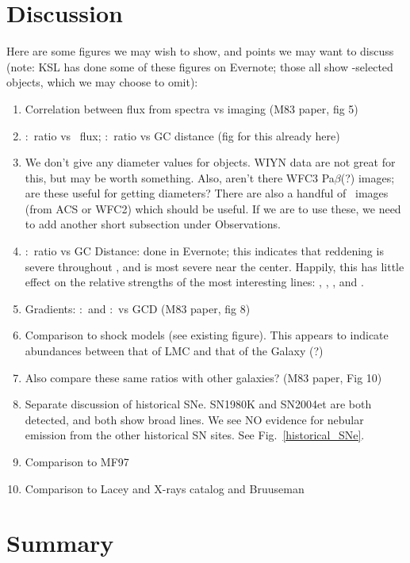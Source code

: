\section{Discussion}
Here are some figures we may wish to show, and points we may want to discuss (note: KSL has done some of these figures on Evernote; those all show \oiii-selected objects, which we may choose to omit):
\begin{enumerate}
    \item Correlation between flux from spectra vs imaging (M83 paper, fig 5)
    \item \sii:\ha\ ratio vs \ha\ flux; \sii:\ha\ ratio vs GC distance (fig for this already here)
    \item We don't give any diameter values for objects.  WIYN data are not great for this, but may be worth something.  Also, aren't there WFC3 Pa$\beta$(?) images; are these useful for getting diameters? There are also a handful of \ha\ images (from ACS or WFC2) which should be useful.  If we are to use these, we need to add another short subsection under Observations.
    \item \hb:\ha\ ratio vs GC Distance: done in Evernote; this indicates that reddening is severe throughout \gal, and is most severe near the center.  Happily, this has little effect on the relative strengths of the most interesting lines: \oi, \ha, \nii, and \sii.
    \item Gradients: \nii:\ha\ and \sii:\ha\ vs GCD (M83 paper, fig 8)
    \item Comparison to shock models (see existing figure).  This appears to indicate abundances between that of LMC and that of the Galaxy (?)
    \item Also compare these same ratios with other galaxies? (M83 paper, Fig 10)
    \item Separate discussion of historical SNe.  SN1980K and SN2004et are both detected, and both show broad lines.  We see NO evidence for nebular  emission from the other historical SN sites.  See Fig.~\ref{historical_SNe}.
    \item Comparison to MF97
    \item Comparison to Lacey and X-rays catalog and Bruuseman
\end{enumerate}


\section{Summary \label{sec:summary}}

